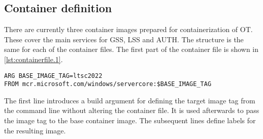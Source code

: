 
\subsection{Container definition}
There are currently three container images prepared for containerization of \ac{OT}. These cover the main services for \ac{GSS}, \ac{LSS} and \ac{AUTH}. The structure is the same for each of the container files. The first part of the container file is shown in \autoref{lst:containerfile.1}.
\begin{lstlisting}[label=lst:containerfile.1, caption={Containerfile for the \ac{LSS}. Description of the base image and variable tagging using a build argument. (\textit{Distribution/Container/session.Containerfile})}, language=docker, firstnumber=1]
ARG BASE_IMAGE_TAG=ltsc2022
FROM mcr.microsoft.com/windows/servercore:$BASE_IMAGE_TAG
\end{lstlisting}
The first line introduces a build argument for defining the target image tag from the command line without altering the container file.  It is used afterwards to pass the image tag to the base container image. The subsequent lines define labels for the resulting image.

\begin{comment}
\begin{lstlisting}[label=lst:containerfile.2, caption={Containerfile for the \ac{GSS}. First part describes the base image and the meta data of the image. (\textit{Distribution/Container/globalsession.Containerfile})}, language=docker, firstnumber=1]
LABEL maintainer="Frankfurt UAS"
LABEL app="open_twin.globalsession"

ENV SIM_PLAT_ROOT="" \
OPEN_TWIN_CERTS_PATH="C:\\app\\Certificates\\" \
OPEN_TWIN_CA_CERT="C:\\app\\Certificates\\ca.pem" \
OPEN_TWIN_SERVER_CERT="C:\\app\\Certificates\\server.pem" \
OPEN_TWIN_SERVER_CERT_KEY="C:\\app\\Certificates\\server-key.pem"

ENV OPEN_TWIN_GSS_SERVICE_ADDRESS=127.0.0.1 \
OPEN_TWIN_AUTH_SERVICE_ADDRESS=127.0.0.1 \
OPEN_TWIN_MONGODB_ADDRESS=tls@127.0.0.1:27017 \
OPEN_TWIN_GSS_PORT=8091 \
OPEN_TWIN_LSS_PORT=8093 \
OPEN_TWIN_AUTH_PORT=8092 \
OPEN_TWIN_GDS_PORT=9094 \
OPEN_TWIN_LDS_PORT=9095
\end{lstlisting}
\end{comment}

